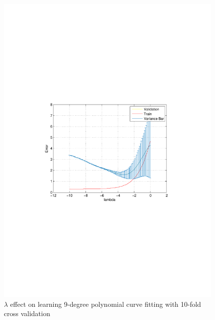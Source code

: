 \documentclass[letterpaper,12pt]{article}
\numberwithin{equation}{section}
\begin{document}
\begin{figure}[htbp]
\vspace{-8.5cm}
 
\centering
      \includegraphics[scale=0.8]{2}
\vspace{-8.3cm}
\caption{\label{fig:variance_bar} 
$\lambda$ effect on learning 9-degree polynomial curve fitting with 10-fold cross validation}
       
\end{figure}
\end{document}
